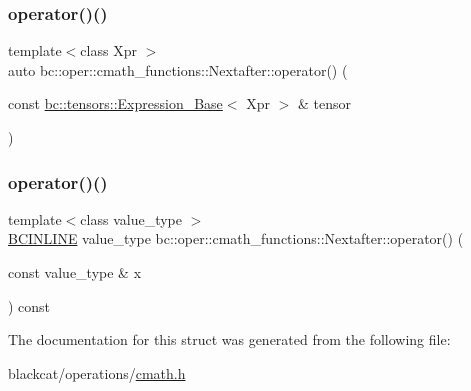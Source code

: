 \mbox{\label{structbc_1_1oper_1_1cmath__functions_1_1Nextafter_a02a6b7704c68b48836fa4229d2b8b37a}} 
\subsubsection{\texorpdfstring{operator()()}{operator()()}\hspace{0.1cm}{\footnotesize\ttfamily [2/3]}}
{\footnotesize\ttfamily template$<$class Xpr $>$ \\
auto bc\+::oper\+::cmath\+\_\+functions\+::\+Nextafter\+::operator() (\begin{DoxyParamCaption}\item[{const \hyperlink{classbc_1_1tensors_1_1Expression__Base}{bc\+::tensors\+::\+Expression\+\_\+\+Base}$<$ Xpr $>$ \&}]{tensor }\end{DoxyParamCaption})\hspace{0.3cm}{\ttfamily [inline]}}

\mbox{\label{structbc_1_1oper_1_1cmath__functions_1_1Nextafter_a03bc931cde3eed4a7e629b365fe6405d}} 
\subsubsection{\texorpdfstring{operator()()}{operator()()}\hspace{0.1cm}{\footnotesize\ttfamily [3/3]}}
{\footnotesize\ttfamily template$<$class value\+\_\+type $>$ \\
\hyperlink{common_8h_a6699e8b0449da5c0fafb878e59c1d4b1}{B\+C\+I\+N\+L\+I\+NE} value\+\_\+type bc\+::oper\+::cmath\+\_\+functions\+::\+Nextafter\+::operator() (\begin{DoxyParamCaption}\item[{const value\+\_\+type \&}]{x }\end{DoxyParamCaption}) const\hspace{0.3cm}{\ttfamily [inline]}}



The documentation for this struct was generated from the following file\+:\begin{DoxyCompactItemize}
\item 
blackcat/operations/\hyperlink{cmath_8h}{cmath.\+h}\end{DoxyCompactItemize}
